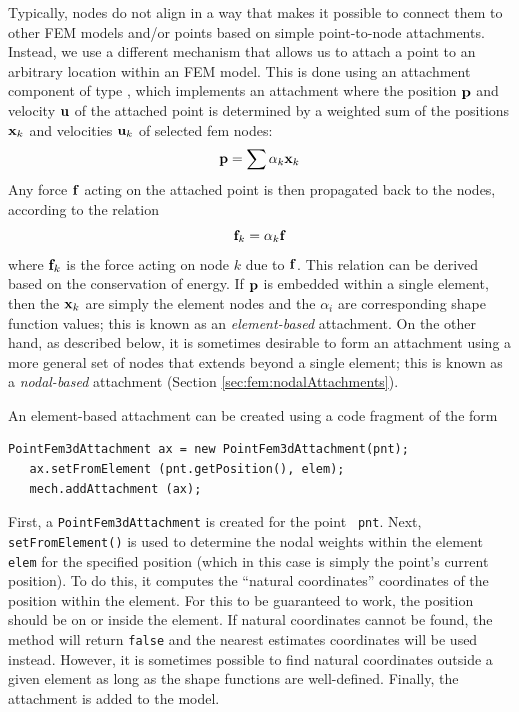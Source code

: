 Typically, nodes do not align in a way that makes it
possible to connect them to other FEM models and/or points based on
simple point-to-node attachments.  Instead, we use a different
mechanism that allows us to attach a point to an arbitrary location
within an FEM model. This is done using an attachment component of
type
, which
implements an attachment where the position ${\bf p}$ and velocity ${\bf u}$ of the
attached point is determined by a weighted sum of the positions ${\bf x}_k$ 
and velocities ${\bf u}_k$ of selected fem nodes:
%
\begin{equation}
{\bf p} = \sum \alpha_k {\bf x}_k
\label{pointFemAttachment:eqn}
\end{equation}
%
Any force ${\bf f}$ acting on the attached point is then propagated back
to the nodes, according to the relation
%
\begin{equation}
{\bf f}_k = \alpha_k {\bf f}
\label{pointFemForces:eqn}
\end{equation}
%
where ${\bf f}_k$ is the force acting on node $k$ due to ${\bf f}$.  This
relation can be derived based on the conservation of energy.
If ${\bf p}$ is embedded within a single element, then the ${\bf x}_k$ are
simply the element nodes and the $\alpha_i$ are corresponding shape
function values; this is known as an {\it element-based} attachment.
On the other hand, as described below, it is sometimes desirable to
form an attachment using a more general set of nodes that extends
beyond a single element; this is known as a {\it nodal-based}
attachment (Section \ref{sec:fem:nodalAttachments}).

An element-based attachment can be created using a code fragment
of the form
%
\begin{lstlisting}[]
   PointFem3dAttachment ax = new PointFem3dAttachment(pnt);
   ax.setFromElement (pnt.getPosition(), elem);
   mech.addAttachment (ax);
\end{lstlisting}
%
First, a {\tt PointFem3dAttachment} is created for the point {\tt
pnt}. Next, {\tt setFromElement()} is used to determine the nodal
weights within the element {\tt elem} for the specified position
(which in this case is simply the point's current position).  To do
this, it computes the ``natural coordinates'' coordinates of the
position within the element. For this to be guaranteed to work, the
position should be on or inside the element. If natural coordinates
cannot be found, the method will return {\tt false} and the nearest
estimates coordinates will be used instead. However, it is
sometimes possible to find natural coordinates outside a given element
as long as the shape functions are well-defined. Finally, the
attachment is added to the model.


